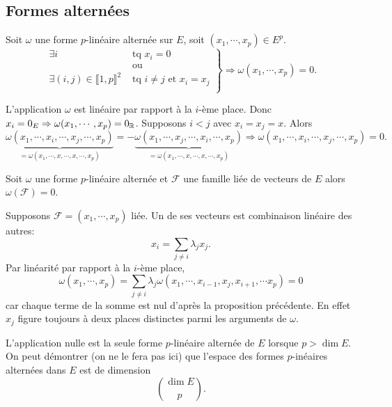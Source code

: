 \subsection{Formes alternées}
\begin{propn}
 Soit $\omega$ une forme $p$-linéaire alternée sur $E$, soit $(x_1, \cdots, x_p) \in E^p$.
 \[
  \left. 
  \begin{aligned}
   \exists i &\text{ tq } x_i = 0\\
             &\text{ ou }\\
   \exists (i,j) \in \llbracket 1,p \rrbracket^2 &\text{ tq } i\neq j \text{ et } x_i = x_j \\
  \end{aligned}
\right\rbrace \Rightarrow \omega(x_1, \cdots, x_p) = 0.
 \]
\end{propn}
\begin{demo}
 L'application $\omega$ est linéaire par rapport à la $i$-ème place. Donc $x_i=0_E \Rightarrow \omega(x_1,\cdots,x_p)=0_{\mathbb{R}}$.\newline
 Supposons $i < j$ avec $x_i = x_j = x$. Alors
\[
\underset{= \omega(x_1,\cdots,x, \cdots ,x, \cdots,x_p)}{\underbrace{\omega(x_1,\cdots,x_i, \cdots ,x_j, \cdots,x_p)}}
=
- \underset{= \omega(x_1,\cdots,x, \cdots ,x, \cdots,x_p)}{\underbrace{\omega(x_1,\cdots,x_j, \cdots ,x_i, \cdots,x_p)}}  
\Rightarrow \omega(x_1,\cdots,x_i, \cdots ,x_j, \cdots,x_p) = 0.
\]
\end{demo}
\begin{propn}
 Soit $\omega$ une forme $p$-linéaire alternée et $\mathcal F$ une famille liée de vecteurs de $E$ alors $\omega(\mathcal F)=0$.
\end{propn}
\begin{demo}
  Supposons $\mathcal{F} = (x_1, \cdots,x_p)$ liée. Un de ses vecteurs est combinaison linéaire des autres:
\[
  x_i = \sum_{j\neq i} \lambda_j x_j.
\]
Par linéarité par rapport à la $i$-ème place,
\[
  \omega(x_1, \cdots, x_p) = \sum_{j\neq i} \lambda_j \omega(x_1,\cdots,x_{i-1},x_j,x_{i+1},\cdots x_p) = 0
\]
car chaque terme de la somme est nul d'après la proposition précédente. En effet $x_j$ figure toujours à deux places distinctes parmi les arguments de $\omega$.
\end{demo}
L'application nulle est la seule forme $p$-linéaire alternée de $E$ lorsque $p>\dim E$. On peut démontrer (on ne le fera pas ici) que l'espace des formes $p$-inéaires alternées dans $E$ est de dimension
\begin{displaymath}
 \binom{\dim E}{p}.
\end{displaymath}
